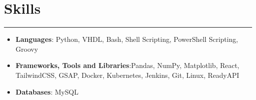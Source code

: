 \documentclass[a4paper]{article}
\newcommand{\tightsection}[1]{
  \vspace{-0.9em}
  \section*{#1}
  \vspace{-0.95em}
  {\color{gray}\hrule height 0.5pt}
  \vspace{0.5em}
}
\begin{document}
\tightsection{Skills}
\begin{itemize}[noitemsep,topsep=0pt]
  \item \textbf{Languages}: Python, VHDL, Bash, Shell Scripting, PowerShell Scripting, Groovy
  \item \textbf{Frameworks, Tools and Libraries}:Pandas, NumPy, Matplotlib, React, TailwindCSS, GSAP, Docker, Kubernetes, Jenkins, Git, Linux, ReadyAPI
  \item \textbf{Databases}: MySQL
\end{itemize}
\end{document}
